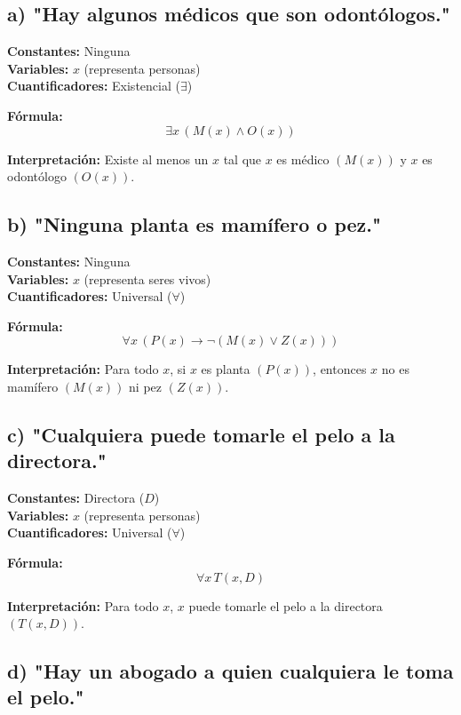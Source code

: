 \documentclass[11pt,letterpaper]{article}
\begin{document}
\subsection*{a) "Hay algunos médicos que son odontólogos."}

\textbf{Constantes:} Ninguna \\
\textbf{Variables:} \( x \) (representa personas) \\
\textbf{Cuantificadores:} Existencial (\( \exists \))

\textbf{Fórmula:}
\[
\exists x \, (M(x) \land O(x))
\]

\textbf{Interpretación:} Existe al menos un \( x \) tal que \( x \) es médico \( (M(x)) \) y \( x \) es odontólogo \( (O(x)) \).

\subsection*{b) "Ninguna planta es mamífero o pez."}

\textbf{Constantes:} Ninguna \\
\textbf{Variables:} \( x \) (representa seres vivos) \\
\textbf{Cuantificadores:} Universal (\( \forall \))

\textbf{Fórmula:}
\[
\forall x \, (P(x) \rightarrow \neg (M(x) \lor Z(x)))
\]

\textbf{Interpretación:} Para todo \( x \), si \( x \) es planta \( (P(x)) \), entonces \( x \) no es mamífero \( (M(x)) \) ni pez \( (Z(x)) \).

\subsection*{c) "Cualquiera puede tomarle el pelo a la directora."}

\textbf{Constantes:} Directora (\( D \)) \\
\textbf{Variables:} \( x \) (representa personas) \\
\textbf{Cuantificadores:} Universal (\( \forall \))

\textbf{Fórmula:}
\[
\forall x \, T(x, D)
\]

\textbf{Interpretación:} Para todo \( x \), \( x \) puede tomarle el pelo a la directora \( (T(x, D)) \).

\subsection*{d) "Hay un abogado a quien cualquiera le toma el pelo."}
\end{document}
